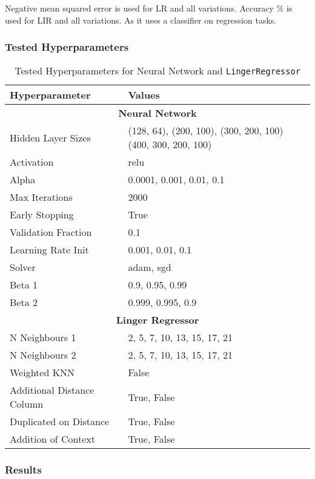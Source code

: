\documentclass[a4paper, 12pt]{report}
\begin{document}
Negative mean squared error is used for LR and all variations.
Accuracy $\%$ is used for LIR and all variations. As it uses a classifier on regression tasks.
\subsubsection{Tested Hyperparameters}

\begin{table}[H]
    \centering
    \caption{Tested Hyperparameters for Neural Network and \texttt{LingerRegressor}}
    \label{tab:hyperparameters_abalone}
    \begin{tabular}{|l|l|}
    \hline
    \textbf{Hyperparameter} & \textbf{Values} \\ \hline
    \multicolumn{2}{|c|}{\textbf{Neural Network}} \\ \hline
    Hidden Layer Sizes &  (128, 64), (200, 100), (300, 200, 100) (400, 300, 200, 100)\\ \hline
    Activation & relu \\ \hline
    Alpha & 0.0001, 0.001, 0.01, 0.1 \\ \hline
    Max Iterations & 2000 \\ \hline
    Early Stopping & True \\ \hline
    Validation Fraction & 0.1 \\ \hline
    Learning Rate Init & 0.001, 0.01, 0.1 \\ \hline
    Solver & adam, sgd \\ \hline
    Beta 1 & 0.9, 0.95, 0.99 \\ \hline
    Beta 2 & 0.999, 0.995, 0.9 \\ \hline
    \multicolumn{2}{|c|}{\textbf{Linger Regressor}} \\ \hline
    N Neighbours 1 & 2, 5, 7, 10, 13, 15, 17, 21 \\ \hline
    N Neighbours 2 & 2, 5, 7, 10, 13, 15, 17, 21 \\ \hline
    Weighted KNN & False \\ \hline
    Additional Distance Column & True, False \\ \hline
    Duplicated on Distance & True, False \\ \hline
    Addition of Context & True, False \\ \hline
    \end{tabular}
\end{table}
\clearpage

\subsubsection{Results}
\end{document}
